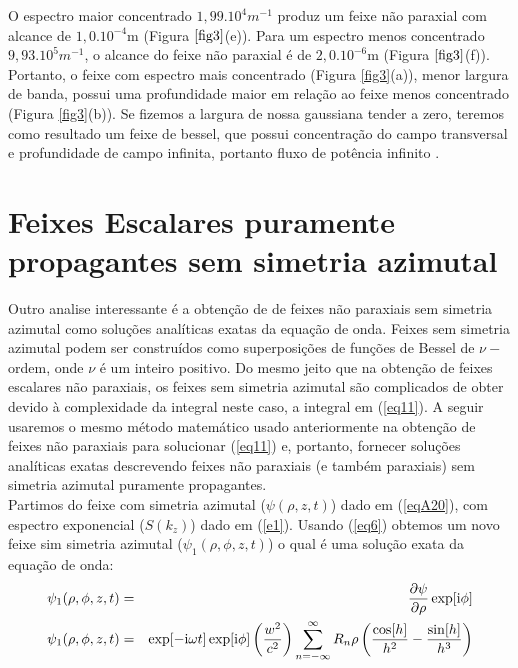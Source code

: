 O espectro maior concentrado $1,99.10^{4}m^{-1}$ produz um feixe n\~ao paraxial com alcance de $1,0.10^{-4}$m (Figura $\ref{fig3}$(e)). Para um espectro menos concentrado $9,93.10^{5}m^{-1}$, o alcance do feixe n\~ao paraxial \'e de $2,0.10^{-6}$m (Figura $\ref{fig3}$(f)). Portanto, o feixe com espectro mais concentrado (Figura \ref{fig3}(a)), menor largura de banda, possui uma profundidade maior em rela\c{c}\~ao ao feixe menos concentrado (Figura \ref{fig3}(b)). Se fizemos  a largura de nossa gaussiana tender a zero, teremos como resultado um feixe de bessel, que possui concentra\c{c}\~ao do campo transversal e profundidade de campo infinita, portanto fluxo de pot\^encia infinito .  
\section{Feixes Escalares puramente propagantes sem simetria azimutal}
Outro analise interessante \'e a obten\c{c}\~ao de de feixes n\~ao paraxiais sem simetria azimutal como solu\c{c}\~oes anal\'iticas exatas da equa\c{c}\~ao de onda. Feixes sem simetria azimutal podem ser constru\'idos como superposi\c{c}\~oes de fun\c{c}\~oes de Bessel de $\nu-$ordem, onde $\nu$ \'e um inteiro positivo. Do mesmo jeito que na obten\c{c}\~ao de feixes escalares n\~ao  paraxiais, os feixes sem simetria azimutal s\~ao complicados de obter devido \`a complexidade da integral neste caso, a integral em (\ref{eq11}). A seguir usaremos o mesmo m\'etodo matem\'atico usado anteriormente na obten\c{c}\~ao de feixes n\~ao paraxiais para solucionar (\ref{eq11}) e, portanto, fornecer solu\c{c}\~oes anal\'iticas exatas descrevendo feixes n\~ao paraxiais (e tamb\'em paraxiais) sem simetria azimutal puramente propagantes.\\
Partimos do feixe com simetria azimutal ($\psi(\rho,z,t)$) dado em (\ref{eqA20}), com espectro exponencial ($S(k_z)$) dado em (\ref{e1}). Usando (\ref{eq6}) obtemos um novo feixe sim simetria azimutal ($\psi_{1}(\rho,\phi,z,t)$) o qual \'e uma solu\c{c}\~ao exata da equa\c{c}\~ao de onda:
\begin{eqnarray}\label{eqs1}
\psi_{1}(\rho,\phi,z,t) &=& \frac{\partial\psi }{\partial \rho}\exp[{\rm i}\phi]\nonumber\\
\psi_{1}(\rho,\phi,z,t) &=&  \exp[-{\rm i}\omega t]\exp[{\rm i}\phi]\left( \frac{w^2}{c^2}\right)\sum\limits_{n=-\infty}^{\infty}R_n \rho  \left(\frac{\cos [h]}{h^2}-\frac{\sin [h]}{h^3}\right)
\end{eqnarray}

